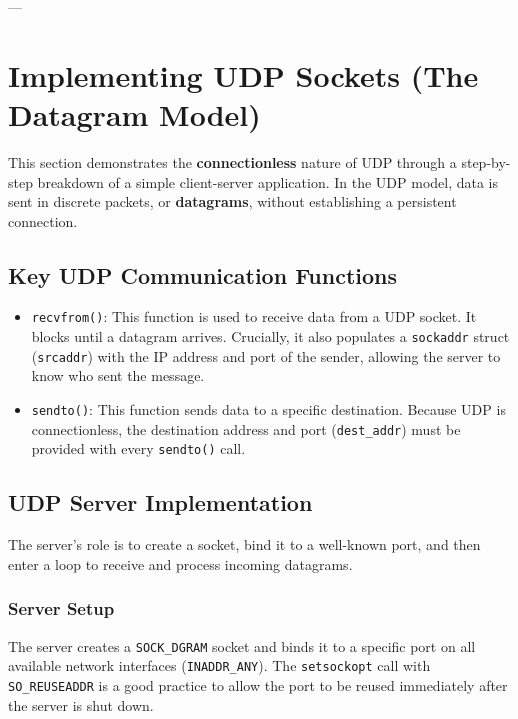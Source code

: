 \documentclass{article}
\begin{document}
---

\section[Implementing UDP Sockets]{Implementing UDP Sockets (The Datagram Model)}

This section demonstrates the \textbf{connectionless} nature of UDP through a step-by-step breakdown of a simple client-server application. In the UDP model, data is sent in discrete packets, or \textbf{datagrams}, without establishing a persistent connection.

\subsection{Key UDP Communication Functions}

\begin{itemize}
    \item \texttt{recvfrom()}: This function is used to receive data from a UDP socket. It blocks until a datagram arrives. Crucially, it also populates a \texttt{sockaddr} struct (\texttt{srcaddr}) with the IP address and port of the sender, allowing the server to know who sent the message.
    \item \texttt{sendto()}: This function sends data to a specific destination. Because UDP is connectionless, the destination address and port (\texttt{dest\_addr}) must be provided with every \texttt{sendto()} call.
\end{itemize}

\subsection{UDP Server Implementation}

The server's role is to create a socket, bind it to a well-known port, and then enter a loop to receive and process incoming datagrams.

\subsubsection{Server Setup}

The server creates a \texttt{SOCK\_DGRAM} socket and binds it to a specific port on all available network interfaces (\texttt{INADDR\_ANY}). The \texttt{setsockopt} call with \texttt{SO\_REUSEADDR} is a good practice to allow the port to be reused immediately after the server is shut down.
\end{document}
